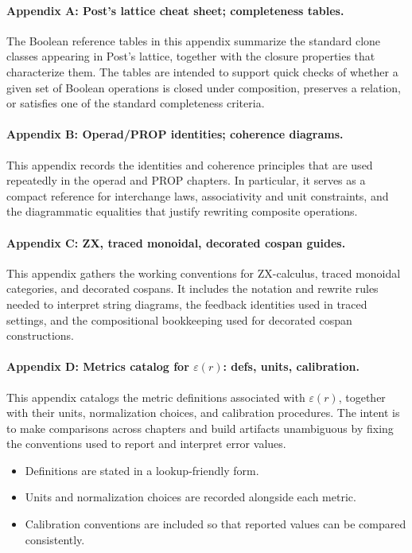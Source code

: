 \documentclass[11pt]{article}
\begin{document}
\paragraph{Appendix A: Post's lattice cheat sheet; completeness tables.} The Boolean reference tables in this appendix summarize the standard clone classes appearing in Post's lattice, together with the closure properties that characterize them. The tables are intended to support quick checks of whether a given set of Boolean operations is closed under composition, preserves a relation, or satisfies one of the standard completeness criteria.

\paragraph{Appendix B: Operad/PROP identities; coherence diagrams.} This appendix records the identities and coherence principles that are used repeatedly in the operad and PROP chapters. In particular, it serves as a compact reference for interchange laws, associativity and unit constraints, and the diagrammatic equalities that justify rewriting composite operations.

\paragraph{Appendix C: ZX, traced monoidal, decorated cospan guides.} This appendix gathers the working conventions for ZX-calculus, traced monoidal categories, and decorated cospans. It includes the notation and rewrite rules needed to interpret string diagrams, the feedback identities used in traced settings, and the compositional bookkeeping used for decorated cospan constructions.

\paragraph{Appendix D: Metrics catalog for $\varepsilon(r)$: defs, units, calibration.} This appendix catalogs the metric definitions associated with $\varepsilon(r)$, together with their units, normalization choices, and calibration procedures. The intent is to make comparisons across chapters and build artifacts unambiguous by fixing the conventions used to report and interpret error values.

\begin{itemize}
  \item Definitions are stated in a lookup-friendly form.
  \item Units and normalization choices are recorded alongside each metric.
  \item Calibration conventions are included so that reported values can be compared consistently.
\end{itemize}
\end{document}
